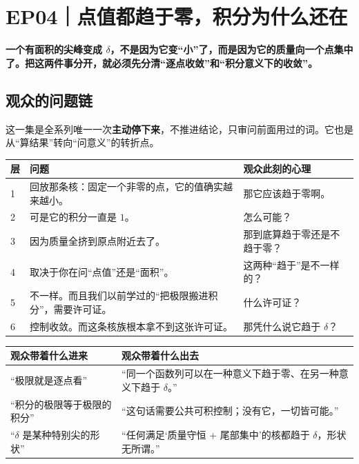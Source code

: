 \chapter{EP04｜点值都趋于零，积分为什么还在}

\begin{ideabox}[这一集的一句话]
\textbf{一个有面积的尖峰变成 $\delta$，不是因为它变“小”了，而是因为它的质量向一个点集中了。把这两件事分开，就必须先分清“逐点收敛”和“积分意义下的收敛”。}
\end{ideabox}

\section{观众的问题链}

这一集是全系列唯一一次\textbf{主动停下来}，不推进结论，只审问前面用过的词。它也是从“算结果”转向“问意义”的转折点。

\begin{center}
\small
\renewcommand{\arraystretch}{1.32}
\begin{tabularx}{\textwidth}{@{}p{0.8cm}X p{4.4cm}@{}}
\toprule
层 & 问题 & 观众此刻的心理 \\
\midrule
1 & 回放那条核：固定一个非零的点，它的值确实越来越小。 & 那它应该趋于零啊。\\
2 & 可是它的积分一直是 $1$。 & 怎么可能？\\
3 & 因为质量全挤到原点附近去了。 & 那到底算趋于零还是不趋于零？\\
4 & 取决于你在问“点值”还是“面积”。 & 这两种“趋于”是不一样的？\\
5 & 不一样。而且我们以前学过的“把极限搬进积分”，需要许可证。 & 什么许可证？\\
6 & 控制收敛。而这条核族根本拿不到这张许可证。 & 那凭什么说它趋于 $\delta$？\\
\bottomrule
\end{tabularx}
\end{center}

\begin{center}
\small
\renewcommand{\arraystretch}{1.32}
\begin{tabularx}{\textwidth}{@{}p{3.2cm}Y@{}}
\toprule
观众带着什么进来 & 观众带着什么出去 \\
\midrule
“极限就是逐点看” & “同一个函数列可以在一种意义下趋于零、在另一种意义下趋于 $\delta$。”\\
“积分的极限等于极限的积分” & “这句话需要公共可积控制；没有它，一切皆可能。”\\
“$\delta$ 是某种特别尖的形状” & “任何满足‘质量守恒 + 尾部集中’的核都趋于 $\delta$，形状无所谓。”\\
\bottomrule
\end{tabularx}
\end{center}

